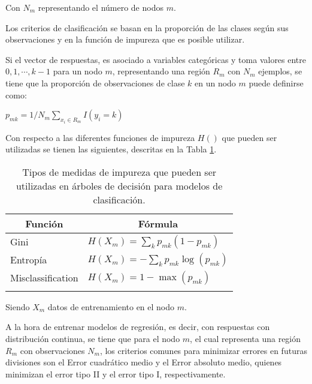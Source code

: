 Con $N_{m}$ representando el número de nodos $m$.

Los criterios de clasificación se basan en la proporción de las clases según sus observaciones y en la función de impureza que es posible utilizar.

Si el vector de respuestas, es asociado a variables categóricas y toma valores entre $0,1,\cdots,k-1$ para un nodo $m$, representando una región $R_{m}$ con $N_{m}$ ejemplos, se tiene que la proporción  de observaciones de clase $k$ en un nodo $m$ puede definirse como:

\begin{center}
	$p_{mk} = 1/ N_m \sum_{x_i \in R_m} I(y_i = k)$
\end{center}

Con respecto a las diferentes funciones de impureza $H()$ que pueden ser utilizadas se tienen las siguientes, descritas en la Tabla \ref{tab:tab-form-impureza}. 

\begin{longtable}[c]{|l|l|}
	\hline
	\multicolumn{1}{|c|}{\textbf{Función}} & \multicolumn{1}{c|}{\textbf{Fórmula}}   \\ \hline
	\endfirsthead
	\endhead
	Gini                                   & $H(X_m) = \sum_k p_{mk} (1 - p_{mk})$   \\ \hline
	Entropía                               & $H(X_m) = - \sum_k p_{mk} \log(p_{mk})$ \\ \hline
	Misclassification                      & $H(X_m) = 1 - \max(p_{mk})$             \\ \hline
	\caption{Tipos de medidas de impureza que pueden ser utilizadas en árboles de decisión para modelos de clasificación.
	}
	\label{tab:tab-form-impureza}\\
\end{longtable} 

Siendo $X_{m}$ datos de entrenamiento en el nodo $m$.

A la hora de entrenar modelos de regresión, es decir, con respuestas con distribución continua, se tiene que para el nodo $m$, el cual representa una región $R_{m}$ con observaciones $N_{m}$, los criterios comunes para minimizar errores en futuras divisiones son el Error cuadrático medio y el Error absoluto medio, quienes minimizan el error tipo II y el error tipo I, respectivamente.

